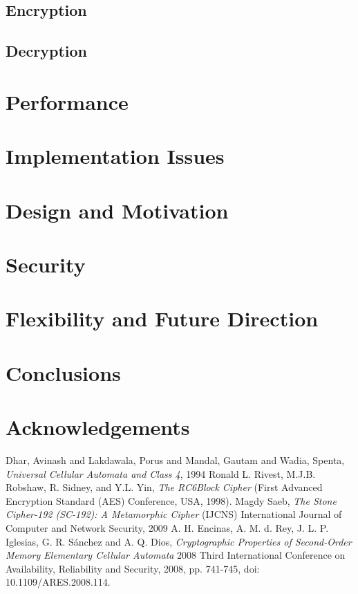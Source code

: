 \documentclass{article}
\begin{document}
\subsection{Encryption}

\subsection{Decryption}

\section{Performance}

\section{Implementation Issues}

\section{Design and Motivation}

\section{Security}

\section{Flexibility and Future Direction}

\section{Conclusions}

\section{Acknowledgements}

\begin{thebibliography}{unsrt}
  Dhar, Avinash and Lakdawala, Porus and Mandal, Gautam and Wadia, Spenta, \emph{Universal Cellular Automata and Class 4}, 1994
  Ronald L. Rivest, M.J.B. Robshaw, R. Sidney, and Y.L. Yin, \emph{The RC6\texttrademark Block Cipher} (First Advanced Encryption Standard (AES) Conference, USA, 1998).
  Magdy Saeb, \emph{The Stone Cipher-192 (SC-192): A Metamorphic Cipher} (IJCNS) International Journal of Computer and Network Security, 2009
  A. H. Encinas, A. M. d. Rey, J. L. P. Iglesias, G. R. Sánchez and A. Q. Dios, \emph{Cryptographic Properties of Second-Order Memory Elementary Cellular Automata} 2008 Third International Conference on Availability, Reliability and Security, 2008, pp. 741-745, doi: 10.1109/ARES.2008.114.
\end{thebibliography}
\end{document}
